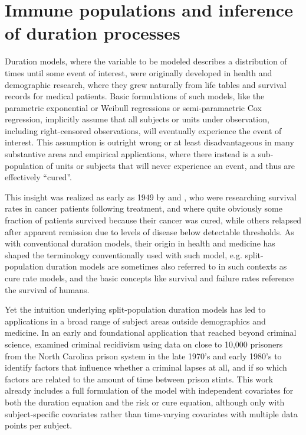 \documentclass[letter]{article}
\begin{document}
\section{Immune populations and inference of duration processes}

Duration models, where the variable to be modeled describes a distribution of times until some event of interest, were originally developed in health and demographic research, where they grew naturally from life tables and survival records for medical patients. Basic formulations of such models, like the parametric exponential or Weibull regressions or semi-paramaetric Cox regression, implicitly assume that all subjects or units under observation, including right-censored observations, will eventually experience the event of interest. This assumption is outright wrong or at least disadvantageous in many substantive areas and empirical applications, where there instead is a sub-population of units or subjects that will never experience an event, and thus are effectively ``cured''. 

This insight was realized as early as 1949 by \citet{boag1949maximum} and \citet{berkson1952survival}, who were researching survival rates in cancer patients following treatment, and where quite obviously some fraction of patients survived because their cancer was cured, while others relapsed after apparent remission due to levels of disease below detectable thresholds. As with conventional duration models, their origin in health and medicine has shaped the terminology conventionally used with such model, e.g. split-population duration models are sometimes also referred to in such contexts as cure rate models, and the basic concepts like survival and failure rates reference the survival of humans.

Yet the intuition underlying split-population duration models has led to applications in a broad range of subject areas outside demographics and medicine. In an early and foundational application that reached beyond criminal science, \citet{schmidt1989predicting} examined criminal recidivism using data on close to 10,000 prisoners from the North Carolina prison system in the late 1970's and early 1980's to identify factors that influence whether a criminal lapses at all, and if so which factors are related to the amount of time between prison stints. This work already includes a full formulation of the model with independent covariates for both the duration equation and the risk or cure equation, although only with subject-specific covariates rather than time-varying covariates with multiple data points per subject.
\end{document}
